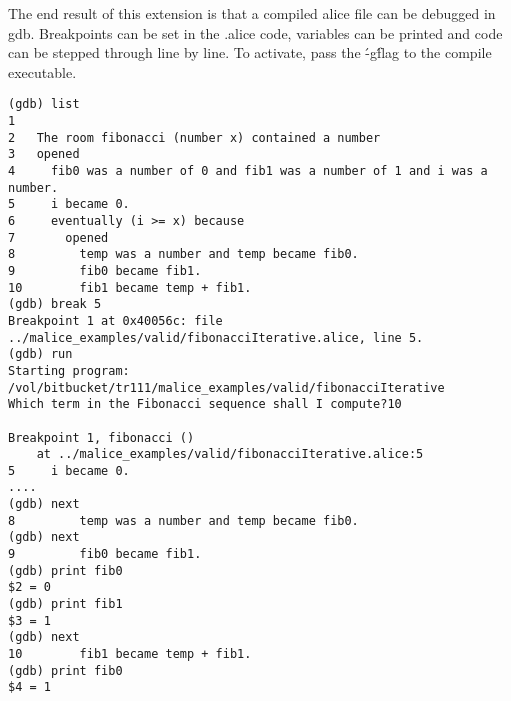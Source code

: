 \documentclass[a4wide, 11pt]{article}
\begin{document}
The end result of this extension is that a compiled alice file can be debugged in gdb. Breakpoints can be set in the .alice code, variables can be printed and code can be stepped through line by line. To activate, pass the \'-g\' flag to the compile executable.

\begin{verbatim}
(gdb) list
1   
2   The room fibonacci (number x) contained a number
3   opened
4     fib0 was a number of 0 and fib1 was a number of 1 and i was a number.
5     i became 0.
6     eventually (i >= x) because
7       opened
8         temp was a number and temp became fib0.
9         fib0 became fib1.
10        fib1 became temp + fib1.
(gdb) break 5
Breakpoint 1 at 0x40056c: file ../malice_examples/valid/fibonacciIterative.alice, line 5.
(gdb) run
Starting program: /vol/bitbucket/tr111/malice_examples/valid/fibonacciIterative 
Which term in the Fibonacci sequence shall I compute?10

Breakpoint 1, fibonacci ()
    at ../malice_examples/valid/fibonacciIterative.alice:5
5     i became 0.
....
(gdb) next
8         temp was a number and temp became fib0.
(gdb) next
9         fib0 became fib1.
(gdb) print fib0
$2 = 0
(gdb) print fib1
$3 = 1
(gdb) next
10        fib1 became temp + fib1.
(gdb) print fib0
$4 = 1

\end{verbatim}
\end{document}
